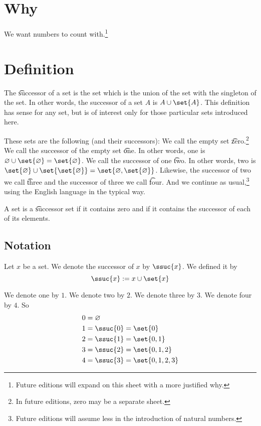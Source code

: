 

\section*{Why}

We want numbers to count with.\footnote{Future editions will expand on this sheet with a more justified why.}
%  


\section*{Definition}

The \t{successor} of a set is the set which is the union of the set with the singleton of the set.
In other words, the successor of a set $A$ is $A \cup \set{A}$.
This definition has sense for any set, but is of interest only for those particular sets introduced here.

These sets are the following (and their successors):
We call the empty set \t{zero}.\footnote{In future editions, zero may be a separate sheet.}
We call the successor of the empty set \t{one}.
In other words, one is $\varnothing \cup \set{\varnothing} = \set{\varnothing}$.
We call the successor of one \t{two}.
In other words, two is $\set{\varnothing} \cup \set{\set{\varnothing}} = \set{\varnothing, \set{\varnothing}}$.
Likewise, the successor of two we call \t{three} and the successor of three we call \t{four}.
And we continue as usual,\footnote{Future editions will assume less in the introduction of natural numbers.}
using the English language in the typical way.

A set is a \t{successor set} if it contains zero and if it contains the successor of each of its elements.

\subsection*{Notation}

Let $x$ be a set.
We denote the successor of $x$ by $\ssuc{x}$.
We defined it by
    \[
\ssuc{x} := x \cup \set{x}
    \]

We denote one by $1$.
We denote two by $2$.
We denote three by $3$.
We denote four by $4$.
So
    \[
\begin{aligned}
0 &= \varnothing \\
1 &= \ssuc{0} = \set{0} \\
2 &= \ssuc{1} = \set{0, 1} \\
3 &= \ssuc{2} = \set{0, 1, 2} \\
4 &= \ssuc{3} = \set{0, 1, 2, 3} \\
\end{aligned}
    \]
%    

